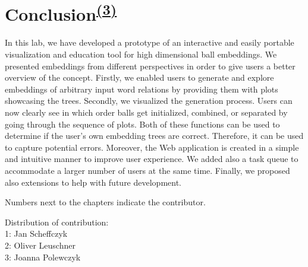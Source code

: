 \section[Conclusion]{Conclusion\textsuperscript{\hyperref[Joanna]{(3)}}}
In this lab, we have developed a prototype of an interactive and easily portable visualization and education tool for high dimensional ball embeddings. We presented embeddings from different perspectives in order to give users a better overview of the concept. Firstly, we enabled users to generate and explore embeddings of arbitrary input word relations by providing them with plots showcasing the trees. Secondly, we visualized the generation process. Users can now clearly see in which order balls get initialized, combined, or separated by going through the sequence of plots. Both of these functions can be used to determine if the user's own embedding trees are correct. Therefore, it can be used to capture potential errors. Moreover, the Web application is created in a simple and intuitive manner to improve user experience. We added also a task queue to accommodate a larger number of users at the same time. Finally, we proposed also extensions to help with future development. 





\newpage

Numbers next to the chapters indicate the contributor.
\vspace{0.5in}

Distribution of contribution:\\
1: Jan Scheffczyk \label{Jan}\\
2: Oliver Leuschner \label{Oliver}\\
3: Joanna Polewczyk \label{Joanna}\\


